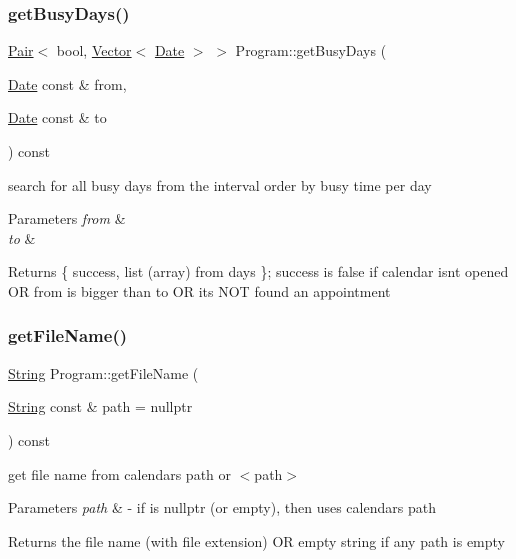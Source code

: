 \subsubsection{\texorpdfstring{get\+Busy\+Days()}{getBusyDays()}}
{\footnotesize\ttfamily \hyperlink{structPair}{Pair}$<$ bool, \hyperlink{classVector}{Vector}$<$ \hyperlink{classDate}{Date} $>$ $>$ Program\+::get\+Busy\+Days (\begin{DoxyParamCaption}\item[{\hyperlink{classDate}{Date} const \&}]{from,  }\item[{\hyperlink{classDate}{Date} const \&}]{to }\end{DoxyParamCaption}) const}

search for all busy days from the interval order by busy time per day 
\begin{DoxyParams}{Parameters}
{\em from} & \\
\hline
{\em to} & \\
\hline
\end{DoxyParams}
\begin{DoxyReturn}{Returns}
\{ success, list (array) from days \}; success is false if calendar isn\textquotesingle{}t opened OR from is bigger than to OR it\textquotesingle{}s N\+OT found an appointment 
\end{DoxyReturn}
\mbox{\label{classProgram_a78c686e8f768666e0377b23317134b4a}} 
\subsubsection{\texorpdfstring{get\+File\+Name()}{getFileName()}}
{\footnotesize\ttfamily \hyperlink{classString}{String} Program\+::get\+File\+Name (\begin{DoxyParamCaption}\item[{\hyperlink{classString}{String} const \&}]{path = {\ttfamily nullptr} }\end{DoxyParamCaption}) const}

get file name from calendar\textquotesingle{}s path or $<$path$>$ 
\begin{DoxyParams}{Parameters}
{\em path} & -\/ if is nullptr (or empty), then uses calendar\textquotesingle{}s path \\
\hline
\end{DoxyParams}
\begin{DoxyReturn}{Returns}
the file name (with file extension) OR empty string if any path is empty 
\end{DoxyReturn}
\mbox{\label{classProgram_a5b0f8b7d9437d17ebc2e851d345f4a9b}} 
